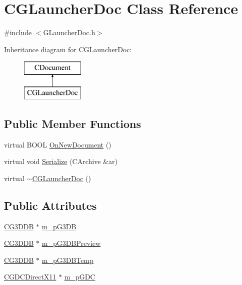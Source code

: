 \hypertarget{class_c_g_launcher_doc}{}\section{C\+G\+Launcher\+Doc Class Reference}
\label{class_c_g_launcher_doc}


{\ttfamily \#include $<$G\+Launcher\+Doc.\+h$>$}

Inheritance diagram for C\+G\+Launcher\+Doc\+:\begin{figure}[H]
\begin{center}
\leavevmode
\includegraphics[height=2.000000cm]{class_c_g_launcher_doc}
\end{center}
\end{figure}
\subsection*{Public Member Functions}
\begin{DoxyCompactItemize}
\item 
virtual B\+O\+O\+L \hyperlink{class_c_g_launcher_doc_ae3632f2c536da8b071a846a31ba1d0a6}{On\+New\+Document} ()
\item 
virtual void \hyperlink{class_c_g_launcher_doc_a7b6fdb4f8c9678c156c6d95961b1b794}{Serialize} (C\+Archive \&ar)
\item 
virtual \hyperlink{class_c_g_launcher_doc_aa427c9667af42dd6962b94f3f3819936}{$\sim$\+C\+G\+Launcher\+Doc} ()
\end{DoxyCompactItemize}
\subsection*{Public Attributes}
\begin{DoxyCompactItemize}
\item 
\hyperlink{class_c_g3_d_d_b}{C\+G3\+D\+D\+B} $\ast$ \hyperlink{class_c_g_launcher_doc_a3692ed7bcc78f864a5a4371f157fbffc}{m\+\_\+p\+G3\+D\+B}
\item 
\hyperlink{class_c_g3_d_d_b}{C\+G3\+D\+D\+B} $\ast$ \hyperlink{class_c_g_launcher_doc_a54225b9689643bc6d05f2f3a7be2a009}{m\+\_\+p\+G3\+D\+B\+Preview}
\item 
\hyperlink{class_c_g3_d_d_b}{C\+G3\+D\+D\+B} $\ast$ \hyperlink{class_c_g_launcher_doc_aa21718d91a4d4a4aea132a01be15998a}{m\+\_\+p\+G3\+D\+B\+Temp}
\item 
\hyperlink{class_c_g_d_c_direct_x11}{C\+G\+D\+C\+Direct\+X11} $\ast$ \hyperlink{class_c_g_launcher_doc_a344922749fac9775a77e51a64c6bebbb}{m\+\_\+p\+G\+D\+C}
\end{DoxyCompactItemize}
